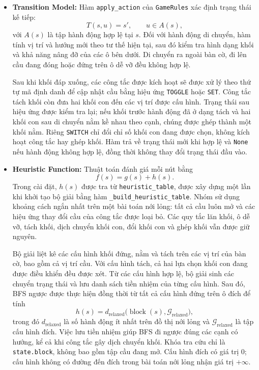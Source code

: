 \begin{itemize}
    \item \textbf{Transition Model:} Hàm \mbox{\texttt{apply\_action}}
    của \texttt{GameRules} xác định trạng thái kế tiếp:
    \[
        T(s, u) = s', \qquad u \in A(s),
    \]
    với $A(s)$ là tập hành động hợp lệ tại $s$. Đối với hành động di
    chuyển, hàm tính vị trí và hướng mới theo tư thế hiện tại, sau đó
    kiểm tra hình dạng khối và khả năng nâng đỡ của các ô bên dưới.
    Di chuyển ra ngoài bàn cờ, đi lên cầu đang đóng hoặc đứng trên ô
    dễ vỡ đều không hợp lệ.

    Sau khi khối đáp xuống, các công tắc được kích hoạt sẽ được xử lý
    theo thứ tự mã định danh để cập nhật cầu bằng hiệu ứng
    \texttt{TOGGLE} hoặc \texttt{SET}. Công tắc tách khối còn đưa hai
    khối con đến các vị trí được cấu hình. Trạng thái sau hiệu ứng được
    kiểm tra lại; nếu khối trước hành động đã ở dạng tách và hai khối
    con sau di chuyển nằm kề nhau theo cạnh, chúng được ghép thành một
    khối nằm. Riêng \texttt{SWITCH} chỉ đổi chỉ số khối con đang được
    chọn, không kích hoạt công tắc hay ghép khối.
    Hàm trả về trạng thái mới khi hợp lệ và \texttt{None} nếu hành động
    không hợp lệ, đồng thời không thay đổi trạng thái đầu vào.

    \item \textbf{Heuristic Function:} Thuật toán đánh giá mỗi nút bằng
    \[
        f(s) = g(s) + h(s).
    \]
    Trong cài đặt, $h(s)$ được tra từ \texttt{heuristic\_table}, được
    xây dựng một lần khi khởi tạo bộ giải bằng hàm
    \texttt{\_build\_heuristic\_table}. Nhóm sử dụng khoảng cách ngắn
    nhất trên một bài toán nới lỏng: tất cả cầu luôn mở và các hiệu ứng
    thay đổi cầu của công tắc được loại bỏ. Các quy tắc lăn khối, ô dễ
    vỡ, tách khối, dịch chuyển khối con, đổi khối con và ghép khối vẫn
    được giữ nguyên.

    Bộ giải liệt kê các cấu hình khối đứng, nằm và tách trên các vị trí
    của bàn cờ, bao gồm cả vị trí cầu. Với cấu hình tách, cả hai lựa
    chọn khối con đang được điều khiển đều được xét. Từ các cấu hình
    hợp lệ, bộ giải sinh các chuyển trạng thái và lưu danh sách tiền
    nhiệm của từng cấu hình. Sau đó, BFS ngược được thực hiện đồng
    thời từ tất cả cấu hình đứng trên ô đích để tính
    \[
        h(s) = d_{\mathrm{relaxed}}\bigl(\operatorname{block}(s),
        \mathcal{G}_{\mathrm{relaxed}}\bigr),
    \]
    trong đó $d_{\mathrm{relaxed}}$ là số hành động ít nhất trên đồ thị
    nới lỏng và $\mathcal{G}_{\mathrm{relaxed}}$ là tập cấu hình đích.
    Việc lưu tiền nhiệm giúp BFS đi ngược đúng các cạnh có hướng, kể
    cả khi công tắc gây dịch chuyển khối. Khóa tra cứu chỉ là
    \texttt{state.block}, không bao gồm tập cầu đang mở. Cấu hình đích
    có giá trị $0$; cấu hình không có đường đến đích trong bài toán
    nới lỏng nhận giá trị $+\infty$.


\end{itemize}
